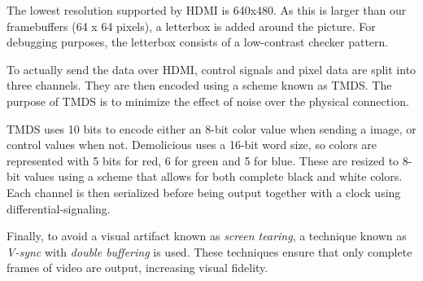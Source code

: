 \documentclass[../main/report.tex]{subfiles}
\begin{document}
The lowest resolution supported by HDMI is 640x480.
As this is larger than our framebuffers (64 x 64 pixels), a letterbox is added around the picture.
For debugging purposes, the letterbox consists of a low-contrast checker pattern.

To actually send the data over HDMI, control signals and pixel data are split into three channels.
They are then encoded using a scheme known as TMDS.
The purpose of TMDS is to minimize the effect of noise over the physical connection.

TMDS uses 10 bits to encode either an 8-bit color value when sending a image, or control values when not.
Demolicious uses a 16-bit word size, so colors are represented with 5 bits for red, 6 for green and 5 for blue.
These are resized to 8-bit values using a scheme that allows for both complete black and white colors.
Each channel is then serialized before being output together with a clock using differential-signaling.

Finally, to avoid a visual artifact known as \emph{screen tearing}, a technique known as \emph{V-sync} with \emph{double buffering} is used.
These techniques ensure that only complete frames of video are output, increasing visual fidelity.
\end{document}
